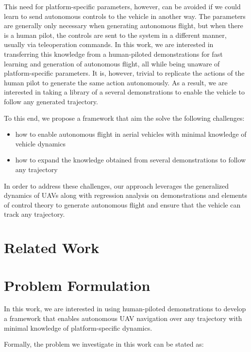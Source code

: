\documentclass[letterpaper, 10 pt, conference]{ieeeconf}  %
\begin{document}
This need for platform-specific parameters, however, can be avoided if we could learn to send autonomous controls to the vehicle in another way. The parameters are generally only necessary when generating autonomous flight, but when there is a human pilot, the controls are sent to the system in a different manner, usually via teleoperation commands. In this work, we are interested in transferring this knowledge from a human-piloted demonstrations for fast learning and generation of autonomous flight, all while being unaware of platform-specific parameters. It is, however, trivial to replicate the actions of the human pilot to generate the same action autonomously. As a result, we are interested in taking a library of a several demonstrations to enable the vehicle to follow any generated trajectory.

To this end, we propose a framework that aim the solve the following challenges:
\begin{itemize}
    \item how to enable autonomous flight in aerial vehicles with minimal knowledge of vehicle dynamics
    \item how to expand the knowledge obtained from several demonstrations to follow any trajectory
\end{itemize}
In order to address these challenges, our approach leverages the generalized dynamics of UAVs along with regression analysis on demonstrations and elements of control theory to generate autonomous flight and ensure that the vehicle can track any trajectory.


\section{Related Work}


\section{Problem Formulation}
In this work, we are interested in using human-piloted demonstrations to develop a framework that enables autonomous UAV navigation over any trajectory with minimal knowledge of platform-specific dynamics.

Formally, the problem we investigate in this work can be stated as:
\end{document}
